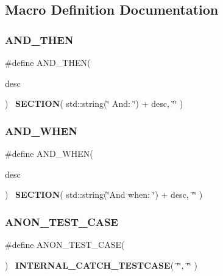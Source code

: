 \subsection{Macro Definition Documentation}
\mbox{\label{catch_8hpp_aafdc2a6cfbcecedec25e64bcbd6c09c6}} 
\subsubsection{A\+N\+D\+\_\+\+T\+H\+EN}
{\footnotesize\ttfamily \#define A\+N\+D\+\_\+\+T\+H\+EN(\begin{DoxyParamCaption}\item[{}]{desc }\end{DoxyParamCaption})~\textbf{ S\+E\+C\+T\+I\+ON}( std\+::string(\char`\"{}     And\+: \char`\"{}) + desc, \char`\"{}\char`\"{} )}

\mbox{\label{catch_8hpp_a054a37584492a5dfbdb5ee0f2fc10b7a}} 
\subsubsection{A\+N\+D\+\_\+\+W\+H\+EN}
{\footnotesize\ttfamily \#define A\+N\+D\+\_\+\+W\+H\+EN(\begin{DoxyParamCaption}\item[{}]{desc }\end{DoxyParamCaption})~\textbf{ S\+E\+C\+T\+I\+ON}( std\+::string(\char`\"{}And when\+: \char`\"{}) + desc, \char`\"{}\char`\"{} )}

\mbox{\label{catch_8hpp_ab41cb63be394c30d48fa579bf8352f18}} 
\subsubsection{A\+N\+O\+N\+\_\+\+T\+E\+S\+T\+\_\+\+C\+A\+SE}
{\footnotesize\ttfamily \#define A\+N\+O\+N\+\_\+\+T\+E\+S\+T\+\_\+\+C\+A\+SE(\begin{DoxyParamCaption}{ }\end{DoxyParamCaption})~\textbf{ I\+N\+T\+E\+R\+N\+A\+L\+\_\+\+C\+A\+T\+C\+H\+\_\+\+T\+E\+S\+T\+C\+A\+SE}( \char`\"{}\char`\"{}, \char`\"{}\char`\"{} )}


